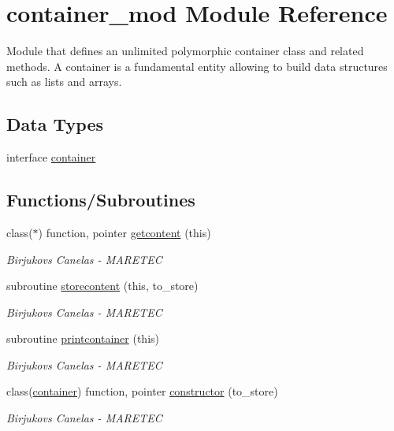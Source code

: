 \hypertarget{namespacecontainer__mod}{}\section{container\+\_\+mod Module Reference}
\label{namespacecontainer__mod}


Module that defines an unlimited polymorphic container class and related methods. A container is a fundamental entity allowing to build data structures such as lists and arrays.  


\subsection*{Data Types}
\begin{DoxyCompactItemize}
\item 
interface \hyperlink{structcontainer__mod_1_1container}{container}
\end{DoxyCompactItemize}
\subsection*{Functions/\+Subroutines}
\begin{DoxyCompactItemize}
\item 
class($\ast$) function, pointer \hyperlink{namespacecontainer__mod_a23a016e747d896622127c0c21dca9836}{getcontent} (this)
\begin{DoxyCompactList}\small\item\em Birjukovs Canelas -\/ M\+A\+R\+E\+T\+EC \end{DoxyCompactList}\item 
subroutine \hyperlink{namespacecontainer__mod_ace49cee012b6cd3c41c03556ab0dd884}{storecontent} (this, to\+\_\+store)
\begin{DoxyCompactList}\small\item\em Birjukovs Canelas -\/ M\+A\+R\+E\+T\+EC \end{DoxyCompactList}\item 
subroutine \hyperlink{namespacecontainer__mod_abf1785185971a527e437d3a489462724}{printcontainer} (this)
\begin{DoxyCompactList}\small\item\em Birjukovs Canelas -\/ M\+A\+R\+E\+T\+EC \end{DoxyCompactList}\item 
class(\hyperlink{structcontainer__mod_1_1container}{container}) function, pointer \hyperlink{namespacecontainer__mod_a6262df4ff34024d566cf8261dc20a248}{constructor} (to\+\_\+store)
\begin{DoxyCompactList}\small\item\em Birjukovs Canelas -\/ M\+A\+R\+E\+T\+EC \end{DoxyCompactList}\end{DoxyCompactItemize}


